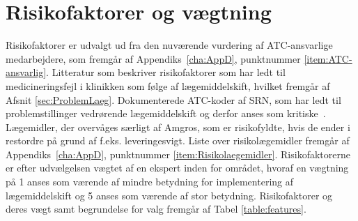 

\section{Risikofaktorer og vægtning}
Risikofaktorer er udvalgt ud fra den nuværende vurdering af ATC-ansvarlige medarbejdere, som fremgår af Appendiks~\ref{cha:AppD}, punktnummer \ref{item:ATC-ansvarlig}. Litteratur som beskriver risikofaktorer som har ledt til medicineringsfejl i klinikken som følge af lægemiddelskift, hvilket fremgår af Afsnit \ref{sec:ProblemLaeg}. Dokumenterede ATC-koder af SRN, som har ledt til problemstillinger vedrørende lægemiddelskift og derfor anses som kritiske~\citep{SRN}. Lægemidler, der overvåges særligt af Amgros, som er risikofyldte, hvis de ender i restordre på grund af f.eks. leveringesvigt. Liste over risikolægemidler fremgår af Appendiks~\ref{cha:AppD}, punktnummer \ref{item:Risikolaegemidler}. Risikofaktorerne er efter udvælgelsen vægtet af en ekspert inden for området, hvoraf en vægtning på 1 anses som værende af mindre betydning for implementering af lægemiddelskift og 5 anses som værende af stor betydning. Risikofaktorer og deres vægt samt begrundelse for valg fremgår af Tabel \ref{table:features}.

